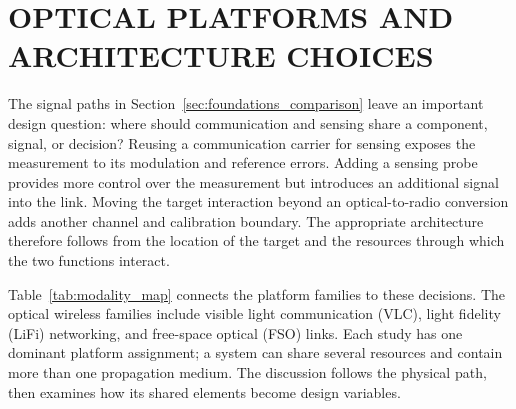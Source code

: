\section{OPTICAL PLATFORMS AND ARCHITECTURE CHOICES}
\label{sec:optical_modality_families}
\label{sec:integration_architectures}

The signal paths in Section~\ref{sec:foundations_comparison} leave an important
design question: where should communication and sensing share a component,
signal, or decision? Reusing a communication carrier for sensing exposes the
measurement to its modulation and reference errors. Adding a sensing probe
provides more control over the measurement but introduces an additional signal
into the link. Moving the target interaction beyond an optical-to-radio
conversion adds another channel and calibration boundary. The appropriate
architecture therefore follows from the location of the target and the
resources through which the two functions interact.

Table~\ref{tab:modality_map} connects the platform families to these decisions.
The optical wireless families include visible light communication (VLC), light
fidelity (LiFi) networking, and free-space optical (FSO) links. Each study has
one dominant platform assignment; a system can share several
resources and contain more than one propagation medium. The discussion follows
the physical path, then examines how its shared elements become design
variables.

